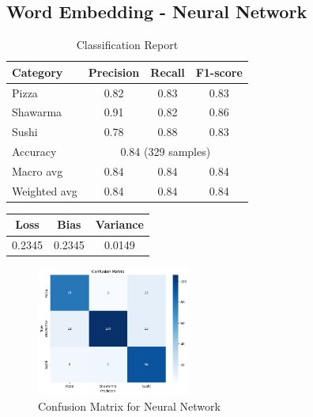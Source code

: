 \subsection{Word Embedding - Neural Network}
\begin{table}[h]
    \centering
    \begin{tabular}{lccc}
        \hline
        Category     & Precision                              & Recall & F1-score \\
        \hline
        Pizza        & 0.82                                   & 0.83   & 0.83     \\
        Shawarma     & 0.91                                   & 0.82   & 0.86     \\
        Sushi        & 0.78                                   & 0.88   & 0.83     \\
        \hline
        Accuracy     & \multicolumn{3}{c}{0.84 (329 samples)}                     \\
        Macro avg    & 0.84                                   & 0.84   & 0.84     \\
        Weighted avg & 0.84                                   & 0.84   & 0.84     \\
        \hline
    \end{tabular}
    \caption{Classification Report}
\end{table}
\begin{table}[h]
    \centering
    \begin{tabular}{ccc}
        \hline
        Loss   & Bias   & Variance \\
        \hline
        0.2345 & 0.2345 & 0.0149   \\
        \hline
    \end{tabular}
\end{table}

\begin{figure}[h]
    \centering
    \includegraphics[width=0.45\textwidth]{params/neuralnetwork_confusion.png}
    \caption{Confusion Matrix for Neural Network}
\end{figure}

